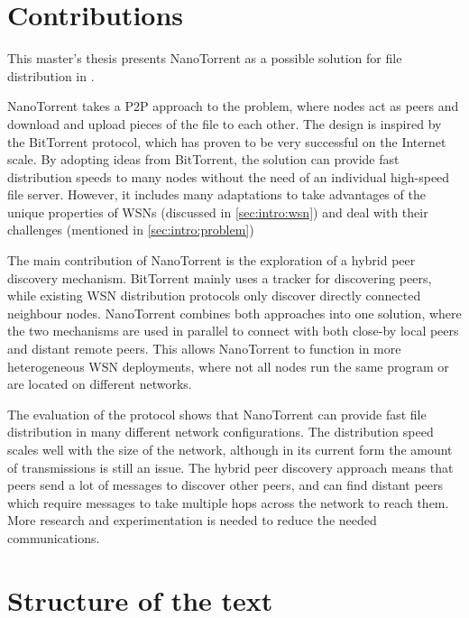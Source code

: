 \section{Contributions}
\label{sec:intro:contrib}
This master's thesis presents NanoTorrent as a possible solution for file distribution in .

NanoTorrent takes a \acrlong{P2P} approach to the problem, where nodes act as peers and download and upload pieces of the file to each other. The design is inspired by the BitTorrent protocol, which has proven to be very successful on the Internet scale. By adopting ideas from BitTorrent, the solution can provide fast distribution speeds to many nodes without the need of an individual high-speed file server. However, it includes many adaptations to take advantages of the unique properties of \glspl{WSN} (discussed in \ref{sec:intro:wsn}) and deal with their challenges (mentioned in \ref{sec:intro:problem})

The main contribution of NanoTorrent is the exploration of a hybrid peer discovery mechanism. BitTorrent mainly uses a tracker for discovering peers, while existing \gls{WSN} distribution protocols only discover directly connected neighbour nodes. NanoTorrent combines both approaches into one solution, where the two mechanisms are used in parallel to connect with both close-by local peers and distant remote peers. This allows NanoTorrent to function in more heterogeneous \gls{WSN} deployments, where not all nodes run the same program or are located on different networks.

The evaluation of the protocol shows that NanoTorrent can provide fast file distribution in many different network configurations. The distribution speed scales well with the size of the network, although in its current form the amount of transmissions is still an issue. The hybrid peer discovery approach means that peers send a lot of messages to discover other peers, and can find distant peers which require messages to take multiple hops across the network to reach them. More research and experimentation is needed to reduce the needed communications.

\section{Structure of the text}
\label{sec:intro:structure}

